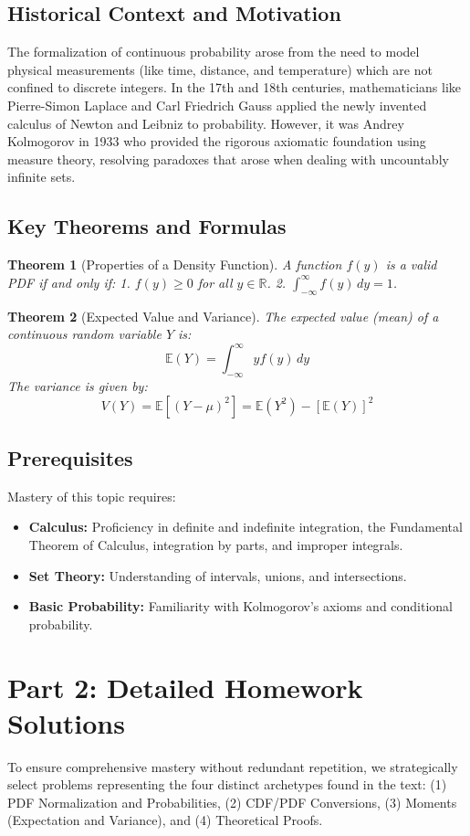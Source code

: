 \documentclass[11pt, a4paper]{article}
\newtheorem{theorem}{Theorem}[section]
\theoremstyle{definition}
\theoremstyle{remark}
\newcommand{\R}{\mathbb{R}}
\newcommand{\E}{\mathbb{E}}
\begin{document}
\subsection{Historical Context and Motivation}
The formalization of continuous probability arose from the need to model physical measurements (like time, distance, and temperature) which are not confined to discrete integers. In the 17th and 18th centuries, mathematicians like Pierre-Simon Laplace and Carl Friedrich Gauss applied the newly invented calculus of Newton and Leibniz to probability. However, it was Andrey Kolmogorov in 1933 who provided the rigorous axiomatic foundation using measure theory, resolving paradoxes that arose when dealing with uncountably infinite sets.

\subsection{Key Theorems and Formulas}
\begin{theorem}[Properties of a Density Function]
A function $f(y)$ is a valid PDF if and only if:
1. $f(y) \ge 0$ for all $y \in \R$.
2. $\int_{-\infty}^{\infty} f(y) \, dy = 1$.
\end{theorem}

\begin{theorem}[Expected Value and Variance]
The expected value (mean) of a continuous random variable $Y$ is:
\[ \E(Y) = \int_{-\infty}^{\infty} y f(y) \, dy \]
The variance is given by:
\[ V(Y) = \E[(Y - \mu)^2] = \E(Y^2) - [\E(Y)]^2 \]
\end{theorem}

\subsection{Prerequisites}
Mastery of this topic requires:
\begin{itemize}
    \item \textbf{Calculus:} Proficiency in definite and indefinite integration, the Fundamental Theorem of Calculus, integration by parts, and improper integrals.
    \item \textbf{Set Theory:} Understanding of intervals, unions, and intersections.
    \item \textbf{Basic Probability:} Familiarity with Kolmogorov's axioms and conditional probability.
\end{itemize}

\newpage
\section{Part 2: Detailed Homework Solutions}
To ensure comprehensive mastery without redundant repetition, we strategically select problems representing the four distinct archetypes found in the text: (1) PDF Normalization and Probabilities, (2) CDF/PDF Conversions, (3) Moments (Expectation and Variance), and (4) Theoretical Proofs.
\end{document}
